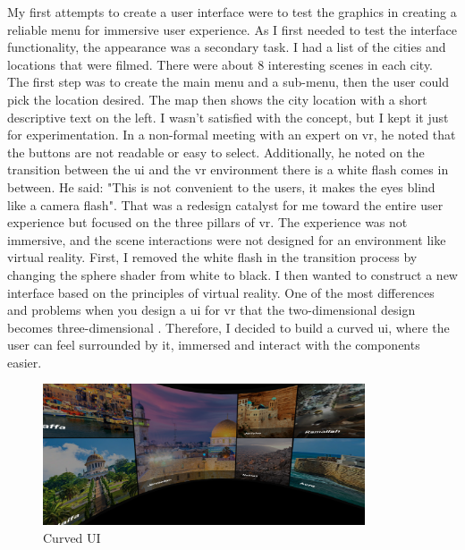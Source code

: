 My first attempts to create a user interface were to test the graphics in creating a reliable menu for immersive user experience. As I first needed to test the interface functionality, the appearance was a secondary task. I had a list of the cities and locations that were filmed. There were about 8 interesting scenes in each city. The first step was to create the main menu and a sub-menu, then the user could pick the location desired. The map then shows the city location with a short descriptive text on the left.  I wasn't satisfied with the concept, but I kept it just for experimentation. In a non-formal meeting with an expert on \acrshort{vr}, he noted that the buttons are not readable or easy to select. Additionally, he noted on the transition between the \acrlong{ui} and the \acrshort{vr} environment there is a white flash comes in between. He said: "This is not convenient to the users, it makes the eyes blind like a camera flash". That was a redesign catalyst for me toward the entire user experience but focused on the three pillars of \acrshort{vr}. The experience was not immersive, and the scene interactions were not designed for an environment like virtual reality. First, I removed the white flash in the transition process by changing the sphere shader from white to black. I then wanted to construct a new interface based on the principles of virtual reality. One of the most differences and problems when you design a \acrlong{ui} for \acrlong{vr} that the two-dimensional design becomes three-dimensional \citep{Kim2005GraphicalEnvironments}. 
Therefore, I decided to build a curved \acrlong{ui}, where the user can feel surrounded by it, immersed and interact with the components easier. 

\begin{figure}[ht]
    \centering
    \includegraphics[width=0.85\textwidth]{images/CurvedUI.png}
    \caption{Curved UI}
    \label{fig:CUI}
\end{figure} 



